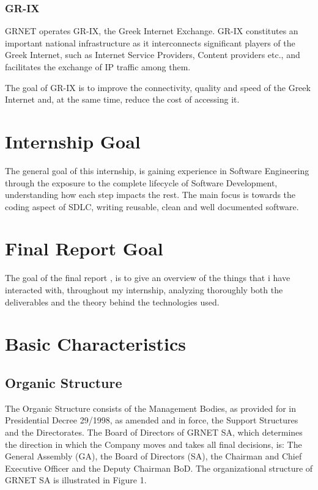 \subsubsection{GR-IX}
GRNET operates GR-IX, the Greek Internet Exchange.
GR-IX constitutes an important national infrastructure
as it interconnects significant players of the Greek Internet,
such as Internet Service Providers, Content providers etc.,
and facilitates the exchange of IP traffic among them.

The goal of GR-IX is to improve the connectivity,
quality and speed of the Greek Internet and,
at the same time, reduce the cost of accessing it.

\section{Internship Goal}
The general goal of this internship, is gaining experience in Software Engineering through the exposure to the complete lifecycle of Software Development, understanding how each step impacts the rest. The main focus is towards the coding aspect of SDLC, writing reusable, clean and well documented software.

\section{Final Report Goal}
The goal of the final report , is to give an overview of the things that i have interacted with, throughout my internship, analyzing thoroughly both the deliverables and the theory behind the technologies used.


\section{Basic Characteristics}\label{ch:basic_characteristics}

\subsection{Organic Structure}
The Organic Structure consists of the Management Bodies,
as provided for in Presidential Decree 29/1998,
as amended and in force, the Support Structures and the Directorates.
The Board of Directors of GRNET SA,
which determines the direction in which the Company moves and takes all final decisions, is:
The General Assembly (GA), the Board of Directors (SA),
the Chairman and Chief Executive Officer and the Deputy Chairman BoD.
The organizational structure of GRNET SA is illustrated in Figure 1.

